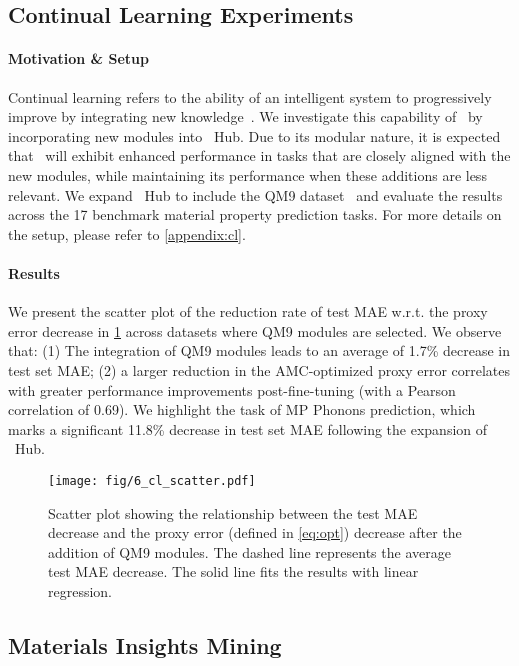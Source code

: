 \subsection{Continual Learning Experiments}
\label{exp:cont}
\paragraph{Motivation \& Setup}
Continual learning refers to the ability of an intelligent system to progressively improve by integrating new knowledge~\cite{wang2024comprehensive}. We investigate this capability of \name \ by incorporating new modules into \name \ Hub. Due to its modular nature, it is expected that \name \ will exhibit enhanced performance in tasks that are closely aligned with the new modules, while maintaining its performance when these additions are less relevant.
We expand \name \ Hub to include the QM9 dataset~\cite{ramakrishnan2014quantum} and evaluate the results across the 17 benchmark material property prediction tasks. For more details on the setup, please refer to \cref{appendix:cl}.

\paragraph{Results}
We present the scatter plot of the reduction rate of test MAE w.r.t. the proxy error decrease in \cref{fig:CL} across datasets where QM9 modules are selected.
We observe that: (1) The integration of QM9 modules leads to an average of 1.7\% decrease in test set MAE; (2) a larger reduction in the AMC-optimized proxy error correlates with greater performance improvements post-fine-tuning (with a Pearson correlation of 0.69). 
We highlight the task of MP Phonons prediction, which marks a significant 11.8\% decrease in test set MAE following the expansion of \name \ Hub.

\begin{figure}[!th]
    \centering
    \texttt{[image: fig/6\_cl\_scatter.pdf]}
    \caption{Scatter plot showing the relationship between the test MAE decrease and the proxy error (defined in \cref{eq:opt}) decrease after the addition of QM9 modules. The dashed line represents the average test MAE decrease. The solid line fits the results with linear regression.}
    \label{fig:CL}
\end{figure}


\subsection{Materials Insights Mining}
\label{exp:interpret}


